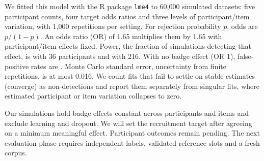 We fitted this model with the R package \texttt{lme4} to 60,000 simulated datasets: five participant counts, four target odds ratios and three levels of participant/item variation, with 1,000 repetitions per setting. For rejection probability $p$, odds are $p/(1-p)$. An odds ratio (OR) of 1.65 multiplies them by 1.65 with participant/item effects fixed. Power, the fraction of simulations detecting that effect, is \RevPowerSmall{} with 36 participants and \RevPowerLargest{} with 216. With no badge effect (OR 1), false-positive rates are \RevNullRange{}. Monte Carlo standard error, uncertainty from finite repetitions, is at most 0.016. We count fits that fail to settle on stable estimates (converge) as non-detections and report them separately from singular fits, where estimated participant or item variation collapses to zero.

Our simulations hold badge effects constant across participants and items and exclude learning and dropout. We will set the recruitment target after agreeing on a minimum meaningful effect. Participant outcomes remain pending. The next evaluation phase requires independent labels, validated reference slots and a fresh corpus.
